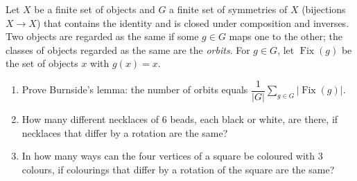 Let $X$ be a finite set of objects and $G$ a finite set of symmetries of $X$ (bijections $X\to X$) that contains the identity and is closed under composition and inverses. Two objects are regarded as the same if some $g\in G$ maps one to the other; the classes of objects regarded as the same are the \emph{orbits}. For $g\in G$, let $\operatorname{Fix}(g)$ be the set of objects $x$ with $g(x)=x$.
\begin{enumerate}
\item[(a)] Prove Burnside's lemma: the number of orbits equals $\dfrac{1}{|G|}\displaystyle\sum_{g\in G}|\operatorname{Fix}(g)|$.
\item[(b)] How many different necklaces of $6$ beads, each black or white, are there, if necklaces that differ by a rotation are the same?
\item[(c)] In how many ways can the four vertices of a square be coloured with $3$ colours, if colourings that differ by a rotation of the square are the same?
\end{enumerate}
